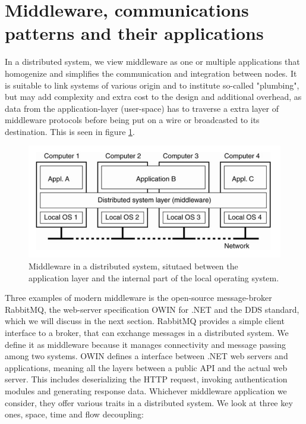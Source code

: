 \section{Middleware, communications patterns and their applications}

In a distributed system, we view middleware as one or multiple applications that homogenize and simplifies the communication and integration between nodes. It is suitable to link systems of various origin and to institute so-called "plumbing", but may add complexity and extra cost to the design and additional overhead, as data from the application-layer (user-space) has to traverse a extra layer of middleware protocols before being put on a wire or broadcasted to its destination. This is seen in figure \ref{fig:middleware}.

\begin{figure}[H]
	\centering
	\includegraphics[scale=0.5]{middleware/middlewaredist.png}
	\caption{Middleware in a distributed system, situtaed between the application layer and the internal part of the local operating system.}
	\label{fig:middleware}
\end{figure}

\noindent Three examples of modern middleware is the open-source message-broker RabbitMQ, the web-server specification OWIN for .NET and the DDS standard, which we will discuss in the next section. RabbitMQ provides a simple client interface to a broker, that can exchange messages in a distributed system. We define it as middleware because it manages connectivity and message passing among two systems. OWIN defines a interface between .NET web servers and applications, meaning all the layers between a public API and the actual web server. This includes deserializing the HTTP request, invoking authentication modules and generating response data. Whichever middleware application we consider, they offer various traits in a distributed system. We look at three key ones, space, time and flow decoupling:

